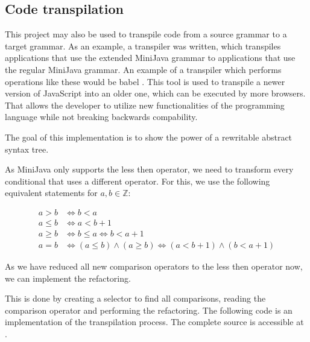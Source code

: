 
\subsection{Code transpilation}

This project may also be used to transpile code from a source grammar to a target grammar. 
As an example, a transpiler was written, which transpiles applications that use
the extended MiniJava grammar to applications that use the regular MiniJava grammar. 
An example of a transpiler which performs operations like these would be babel \cite{babeljs}. This tool is
used to transpile a newer version of JavaScript into an older one, which can be executed by more browsers. 
That allows the developer to utilize new functionalities of the programming language while not breaking backwards compability.

The goal of this implementation is to show the power of a rewritable abstract syntax tree. 

As MiniJava only supports the less then operator, we need to transform every conditional that uses a different operator.
For this, we use the following equivalent statements for $a, b \in \mathbb{Z}$:

\begin{align}
    a > b  &\Longleftrightarrow b < a\\
    a \leq b  &\Longleftrightarrow a < b + 1\\
    a \geq b  &\Longleftrightarrow b \leq a \Longleftrightarrow b < a + 1\\
    a = b  &\Longleftrightarrow (a \leq b) \land (a \geq b) \Longleftrightarrow (a < b + 1) \land (b < a+ 1)
\end{align}

As we have reduced all new comparison operators to the less then operator now, we can implement the refactoring.

This is done by creating a selector to find all comparisons, reading the comparison operator and performing the refactoring.
The following code is an implementation of the transpilation process. The complete source is accessible at \cite{extended_mjava_transformation}.

